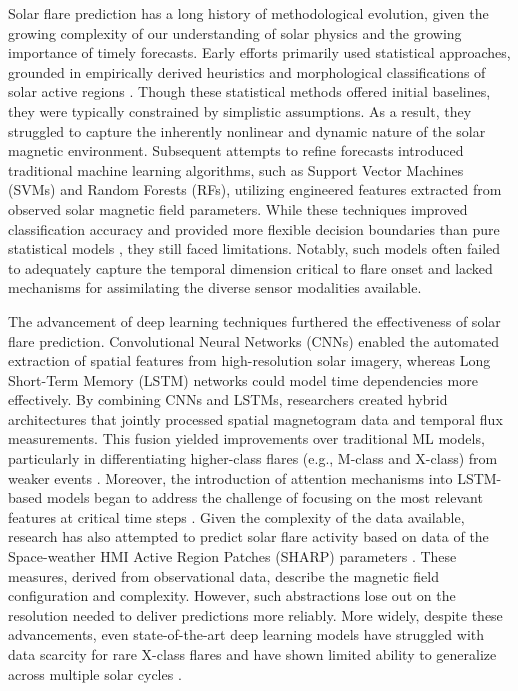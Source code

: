 Solar flare prediction has a long history of methodological evolution, given the growing complexity of our understanding of solar physics and the growing importance of timely forecasts. Early efforts primarily used statistical approaches, grounded in empirically derived heuristics and morphological classifications of solar active regions \citep{RefWorks:RefID:7-schrijver2009driving}. Though these statistical methods offered initial baselines, they were typically constrained by simplistic assumptions. As a result, they struggled to capture the inherently nonlinear and dynamic nature of the solar magnetic environment. Subsequent attempts to refine forecasts introduced traditional machine learning algorithms, such as Support Vector Machines (SVMs) and Random Forests (RFs), utilizing engineered features extracted from observed solar magnetic field parameters. While these techniques improved classification accuracy and provided more flexible decision boundaries than pure statistical models \citep{RefWorks:RefID:12-zheng2023comparative, RefWorks:RefID:2-abduallah2023operational}, they still faced limitations. Notably, such models often failed to adequately capture the temporal dimension critical to flare onset and lacked mechanisms for assimilating the diverse sensor modalities available.

The advancement of deep learning techniques furthered the effectiveness of solar flare prediction. Convolutional Neural Networks (CNNs) enabled the automated extraction of spatial features from high-resolution solar imagery, whereas Long Short-Term Memory (LSTM) networks could model time dependencies more effectively. By combining CNNs and LSTMs, researchers created hybrid architectures that jointly processed spatial magnetogram data and temporal flux measurements. This fusion yielded improvements over traditional ML models, particularly in differentiating higher-class flares (e.g., M-class and X-class) from weaker events \citep{RefWorks:RefID:2-abduallah2023operational, RefWorks:RefID:10-jiao2020solar}. Moreover, the introduction of attention mechanisms into LSTM-based models began to address the challenge of focusing on the most relevant features at critical time steps \citep{RefWorks:RefID:12-zheng2023comparative}. Given the complexity of the data available, research has also attempted to predict solar flare activity based on data of the Space-weather HMI Active Region Patches (SHARP) parameters \citep{RefWorks:RefID:2-abduallah2023operational}. These measures, derived from observational data, describe the magnetic field configuration and complexity. However, such abstractions lose out on the resolution needed to deliver predictions more reliably. More widely, despite these advancements, even state-of-the-art deep learning models have struggled with data scarcity for rare X-class flares and have shown limited ability to generalize across multiple solar cycles \citep{RefWorks:RefID:14-hayes2021solar}.

